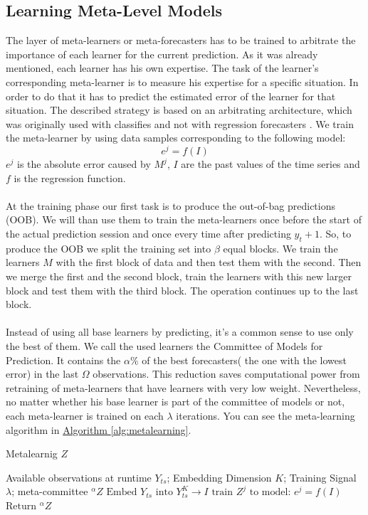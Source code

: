 \documentclass[runningheads,a4paper]{llncs}[2015/06/24]
\begin{document}
\subsection{Learning Meta-Level Models}
The layer of meta-learners or meta-forecasters has to be trained to arbitrate the importance of each learner for the current prediction. As it was already mentioned, each learner has his own expertise. The task of the learner's corresponding meta-learner is to measure his expertise for a specific situation. In order to do that it has to predict the estimated error of the learner for that situation. The  described strategy is based on an arbitrating architecture, which was originally used with classifies and not with regression forecasters \cite{ortega2001arbitrating}. We train the meta-learner by using data samples corresponding to the following model:\begin{equation}
e^j = f(I)
\end{equation} $e^j$ is the absolute error caused by $M^j$, $I$ are the past values of the time series and $f$ is the regression function.\\\\ At the training phase our first task is to produce the out-of-bag predictions (OOB). We will than use them to train the meta-learners once before the start of the actual prediction session and once every time after predicting $y_t+1$. So, to produce the OOB we split the training set into $\beta$ equal blocks. We train the learners $M$ with the first block of data and then test them with the second. Then we merge the first and the second block, train the learners with this new larger block and test them with the third block. The operation continues up to the last block.\\\\Instead of using all base learners by predicting, it's a common sense to use only the best of them. We call the used learners the Committee of Models for Prediction. It contains the $\alpha$\% of the best forecasters( the one with the lowest error) in the last $\Omega$ observations. This reduction saves computational power from retraining of meta-learners that have learners with very low weight. Nevertheless, no matter whether his base learner is part of the committee of models or not, each meta-learner is trained on each $\lambda$ iterations. You can see the meta-learning algorithm in \hyperref[alg:metalearning]{Algorithm  \ref{alg:metalearning}}.
    
\begin{algorithm}[h]

\caption{Metalearnig $Z$}\label{alg:metalearning}
\begin{algorithmic}[1]

\Require Available observations at runtime $Y_{ts}$; Embedding Dimension $K$; Training
Signal $\lambda$; meta-committee ${}^{\alpha}Z$
\State $\text{Embed $Y_{ts}$ into $Y_{ts}^{K}$} \rightarrow I$
\State $\text{train $Z^{j}$ to model: $e^{j} = f(I)$}$
\EndFor
\State $\text{Return ${}^{\alpha}Z$}$
\end{algorithmic}
\end{algorithm}
\end{document}
